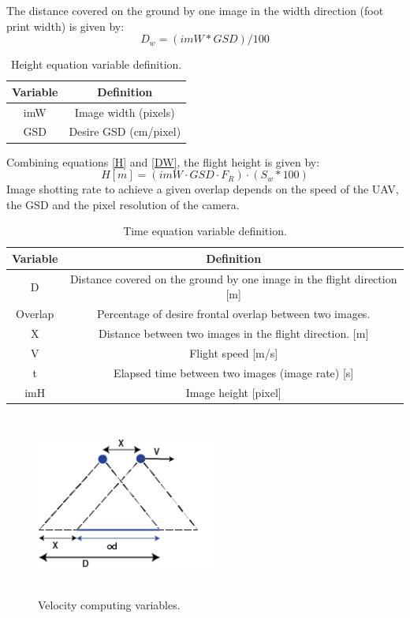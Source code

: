 The distance covered on the ground by one image in the width direction (foot print width) is given by:
\begin{equation}
D_{w}=(imW*GSD)/100
\label{DW}
\end{equation}
\begin{table}[H]
\centering
\begin{tabular}{|c|c|}
\hline
\textbf{Variable} & \textbf{Definition}   \\ \hline
imW              & Image width (pixels)  \\ \hline
GSD               & Desire GSD (cm/pixel) \\ \hline
\end{tabular}
\caption{Height equation variable definition.}
\end{table}
Combining equations \ref{H} and \ref{DW}, the flight height is given by:
\begin{equation}
H[m]=(imW\cdot GSD \cdot F_{R})\cdot (S_{w}*100)
\end{equation}
Image shotting rate to achieve a given overlap depends on the speed of the UAV, the GSD and the pixel resolution of the camera.
\begin{table}[H]
\centering
\begin{tabular}{|c|c|}
\hline
Variable & Definition                                                                  \\ \hline
D        & Distance covered on the ground by one image in the flight direction {[}m{]} \\ \hline
Overlap  & Percentage of desire frontal overlap between two images.                    \\ \hline
X        & Distance between two images in the flight direction. {[}m{]}                \\ \hline
V        & Flight speed {[}m/s{]}                                                      \\ \hline
t        & Elapsed time between two images (image rate) {[}s{]}                        \\ \hline
imH      & Image height {[}pixel{]}                                                    \\ \hline
\end{tabular}
\caption{Time equation variable definition.}
\end{table}
\begin{figure}[H]
\centering
\includegraphics[width=6cm,height=6cm,keepaspectratio]{imagenes/Velocity.png}
\caption{Velocity computing variables.}
\label{fig:velocity}
\end{figure}

